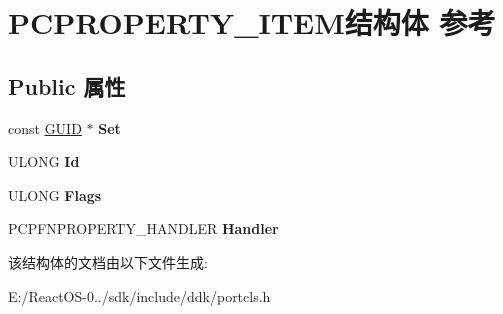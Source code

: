 \hypertarget{struct_p_c_p_r_o_p_e_r_t_y___i_t_e_m}{}\section{P\+C\+P\+R\+O\+P\+E\+R\+T\+Y\+\_\+\+I\+T\+E\+M结构体 参考}
\label{struct_p_c_p_r_o_p_e_r_t_y___i_t_e_m}
\subsection*{Public 属性}
\begin{DoxyCompactItemize}
\item 
\mbox{\label{struct_p_c_p_r_o_p_e_r_t_y___i_t_e_m_ad3da8522f65967f220477f53ba0aad46}} 
const \hyperlink{interface_g_u_i_d}{G\+U\+ID} $\ast$ {\bfseries Set}
\item 
\mbox{\label{struct_p_c_p_r_o_p_e_r_t_y___i_t_e_m_a3ac0acb81553ff94a0d3ace44b75c3b3}} 
U\+L\+O\+NG {\bfseries Id}
\item 
\mbox{\label{struct_p_c_p_r_o_p_e_r_t_y___i_t_e_m_a8e70815e2643842c01b065028d554ae8}} 
U\+L\+O\+NG {\bfseries Flags}
\item 
\mbox{\label{struct_p_c_p_r_o_p_e_r_t_y___i_t_e_m_adbc5163fc6c985cf98e8b236e11a734f}} 
P\+C\+P\+F\+N\+P\+R\+O\+P\+E\+R\+T\+Y\+\_\+\+H\+A\+N\+D\+L\+ER {\bfseries Handler}
\end{DoxyCompactItemize}


该结构体的文档由以下文件生成\+:\begin{DoxyCompactItemize}
\item 
E\+:/\+React\+O\+S-\/0../sdk/include/ddk/portcls.\+h\end{DoxyCompactItemize}
